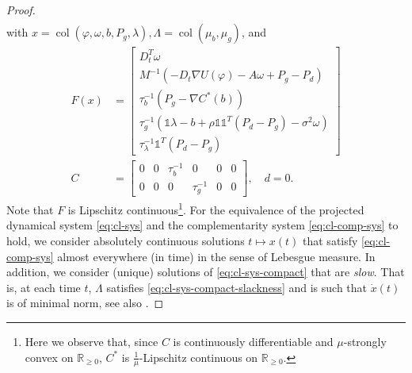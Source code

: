 \documentclass[journal]{IEEEtran}
\newcommand{\w}{\omega}
\newcommand{\1}{\mathds 1}
\newcommand{\vp}{\varphi}
\newcommand{\realnonnegative}{{\mathbb{R}}_{\ge 0}}
\renewcommand{\l}{\lambda}
\DeclareMathOperator{\col}{col}
\theoremstyle{remark}
\theoremstyle{definition}
\begin{document}
\begin{proof}
\begin{subequations}
\begin{align}
    \end{align}
  \end{subequations}
  with $x=\col(\vp,\w,b,P_g,\l), \Lambda=\col(\mu_b,\mu_g)$,  and 
  \begin{subequations}
    \begin{align}
      F(x)&=
      \begin{bmatrix}
        D_t^T\w \\
        M^{-1}(-D_t\nabla U(\vp)-A\w+P_g-P_d)\\
        \tau_b^{-1}( P_g-\nabla C^*(b))\\
        \tau_g^{-1}(\1\l-b+\rho\1\1^T (P_d-P_g) -\sigma^2\w)\\
        \tau_\l^{-1}\1^T(P_d-P_g)
      \end{bmatrix}\label{eq:F}\\
      C&=
      \begin{bmatrix}
        0           & 0          &     \tau_b^{-1} & 0         &0&0  \\
        0           & 0        &    0           & \tau_g^{-1} &0&0
      \end{bmatrix}, \quad d=0.     \label{eq:C-Lambda}
    \end{align}
  \end{subequations}
  Note that $F$ is Lipschitz continuous\footnote{Here we observe that, since $C$ is continuously differentiable and $\mu$-strongly convex on $\realnonnegative$, $C^*$ is $\frac{1}{\mu}$-Lipschitz continuous on $\realnonnegative$.}.  For the equivalence of the projected dynamical system \eqref{eq:cl-sys} and the complementarity system \eqref{eq:cl-comp-sys} to hold, we consider absolutely continuous solutions $t\mapsto x(t)$ that satisfy \eqref{eq:cl-comp-sys} almost everywhere (in time) in the sense of Lebesgue measure. In addition, we consider (unique) solutions of \eqref{eq:cl-sys-compact} that are \emph{slow}. That is, at each time $t$, $\Lambda$ satisfies \eqref{eq:cl-sys-compact-slackness} and is such that $\dot x(t)$ is of minimal norm, see also \cite{brogliato2006equivalence}.



\end{proof}
\end{document}
